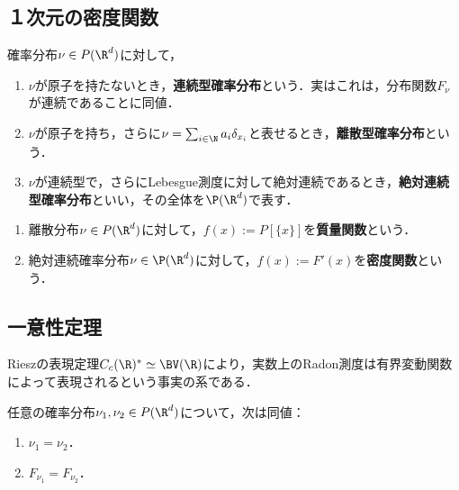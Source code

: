 \documentclass[uplatex,dvipdfmx]{jsreport}
\begin{document}
\subsection{１次元の密度関数}

\begin{definition}
    確率分布$\nu\in P(\R^d)$に対して，
    \begin{enumerate}
        \item $\nu$が原子を持たないとき，\textbf{連続型確率分布}という．実はこれは，分布関数$F_\nu$が連続であることに同値．
        \item $\nu$が原子を持ち，さらに$\nu=\sum_{i\in\N}a_i\delta_{x_i}$と表せるとき，\textbf{離散型確率分布}という．
        \item $\nu$が連続型で，さらにLebesgue測度に対して絶対連続であるとき，\textbf{絶対連続型確率分布}といい，その全体を$\P(\R^d)$で表す．
    \end{enumerate}
\end{definition}

\begin{definition}\mbox{}
    \begin{enumerate}
        \item 離散分布$\nu\in P(\R^d)$に対して，$f(x):=P[\{x\}]$を\textbf{質量関数}という．
        \item 絶対連続確率分布$\nu\in\P(\R^d)$に対して，$f(x):=F'(x)$を\textbf{密度関数}という．
    \end{enumerate}
\end{definition}

\subsection{一意性定理}

\begin{tcolorbox}[colframe=ForestGreen, colback=ForestGreen!10!white,breakable,colbacktitle=ForestGreen!40!white,coltitle=black,fonttitle=\bfseries\sffamily,
title=]
    Rieszの表現定理$C_c(\R)^*\simeq\BV(\R)$により，実数上のRadon測度は有界変動関数によって表現されるという事実の系である．
\end{tcolorbox}

\begin{proposition}[一意性定理]
    任意の確率分布$\nu_1,\nu_2\in P(\R^d)$について，次は同値：
    \begin{enumerate}
        \item $\nu_1=\nu_2$．
        \item $F_{\nu_1}=F_{\nu_2}$．
    \end{enumerate}
\end{proposition}
\end{document}
